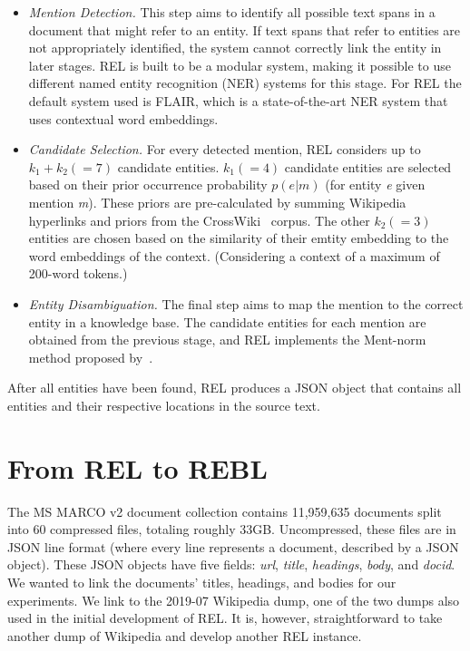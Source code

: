 \begin{itemize}
	\item \emph{Mention Detection.} 
	This step aims to identify all possible text spans in a document that might refer to an entity. If text spans that refer to entities are not appropriately identified, the system cannot correctly link the entity in later stages. REL is built to be a modular system, making it possible to use different named entity recognition (NER) systems for this stage. For REL the default system used is FLAIR, which is a state-of-the-art NER system that uses contextual word embeddings. 
	\item \emph{Candidate Selection.}
	For every detected mention, REL considers up to $k_1 + k_2 (=7)$ candidate entities. $k_1 (=4)$ candidate entities are selected based on their prior occurrence probability $p(e|m)$ (for entity \textit{e} given mention \textit{m}). These priors are pre-calculated by summing Wikipedia hyperlinks and priors from the CrossWiki~\citep{crosswiki} corpus. The other $k_2 (=3)$ entities are chosen based on the similarity of their emtity embedding to the word embeddings of the context. (Considering a context of a maximum of 200-word tokens.)
	\item \emph{Entity Disambiguation.}
	The final step aims to map the mention to the correct entity in a knowledge base. The candidate entities for each mention are obtained from the previous stage, and REL implements the Ment-norm method proposed by~\citet{ED-paper}.  
\end{itemize} 

After all entities have been found, REL produces a JSON object that contains all entities and their respective locations in the source text.

\section{From REL to REBL}
The MS MARCO v2 document collection contains 11,959,635 documents split into 60 compressed files, totaling roughly 33GB. Uncompressed, these files are in JSON line format (where every line represents a document, described by a JSON object). These JSON objects have five fields: \textit{url}, \textit{title}, \textit{headings}, \textit{body}, and \textit{docid}. We wanted to link the documents' titles, headings, and bodies for our experiments. We link to the 2019-07 Wikipedia dump, one of the two dumps also used in the initial development of REL. It is, however, straightforward to take another dump of Wikipedia and develop another REL instance. 

